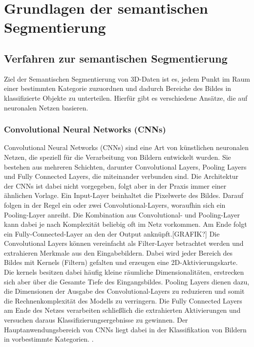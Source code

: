 \chapter{Grundlagen der semantischen Segmentierung}

\section{Verfahren zur semantischen Segmentierung}

Ziel der Semantischen Segmentierung von 3D-Daten ist es, jedem Punkt im Raum
einer bestimmten Kategorie zuzuordnen und dadurch Bereiche des Bildes in
klassifizierte Objekte zu unterteilen. Hierfür gibt es verschiedene Ansätze,
die auf neuronalen Netzen basieren.

\subsection{Convolutional Neural Networks (CNNs)}
Convolutional Neural Networks (CNNs) sind eine Art von künstlichen neuronalen
Netzen, die speziell für die Verarbeitung von Bildern entwickelt wurden. Sie
bestehen aus mehreren Schichten, darunter Convolutional Layers, Pooling Layers
und Fully Connected Layers, die miteinander verbunden sind. Die Architektur der
CNNs ist dabei nicht vorgegeben, folgt aber in der Praxis immer einer ähnlichen
Vorlage. Ein Input-Layer beinhaltet die Pixelwerte des Bildes. Darauf folgen in
der Regel ein oder zwei Convolutional-Layers, woraufhin sich ein Pooling-Layer
anreiht. Die Kombination aus Convolutional- und Pooling-Layer kann dabei je
nach Komplexität beliebig oft im Netz vorkommen. Am Ende folgt ein
Fully-Connected-Layer an den der Output anknüpft.[GRAFIK?] Die Convolutional
Layers können vereinfacht als Filter-Layer betrachtet werden und extrahieren
Merkmale aus den Eingabebildern. Dabei wird jeder Bereich des Bildes mit
Kernels (Filtern) gefalten und erzeugen eine 2D-Aktivierungskarte. Die kernels
besitzen dabei häufig kleine räumliche Dimensionalitäten, erstrecken sich aber
über die Gesamte Tiefe des Eingangsbildes. Pooling Layers dienen dazu, die
Dimensionen der Ausgabe des Convolutional-Layers zu reduzieren und somit die
Rechnenkomplexität des Modells zu verringern. Die Fully Connected Layers am
Ende des Netzes verarbeiten schließlich die extrahierten Aktivierungen und
versuchen daraus Klassifizierungsergebnisse zu gewinnen. Der
Hauptanwendungsbereich von CNNs liegt dabei in der Klassifikation von Bildern
in vorbestimmte Kategorien. \cite{OShea.11262015}.

